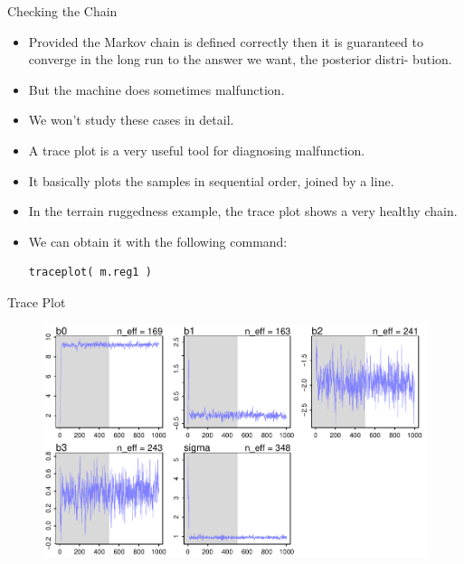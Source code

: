 \documentclass[handout]{beamer}
\begin{document}
\begin{frame}[fragile]{Checking the Chain }
\scriptsize{


\begin{itemize}


\item Provided the Markov chain is defined correctly then it is guaranteed to converge in the long run to the answer we want, the posterior distri-
bution. 
\item But the machine does sometimes malfunction.

\item We won't study these cases in detail.

\item A trace plot is a very useful tool for diagnosing malfunction.

\item It basically plots the samples in sequential order, joined by a line.

\item In the terrain ruggedness example, the trace plot shows a very healthy chain.

\item We can obtain it with the following command:

\begin{verbatim}
traceplot( m.reg1 ) 
\end{verbatim}


 \end{itemize}




} 
\end{frame}


\begin{frame}{Trace Plot}



 \begin{figure}[h!]
	\centering
	\includegraphics[scale=0.7]{pics/traceplot.pdf}
	\end{figure} 



\end{frame}
\end{document}
